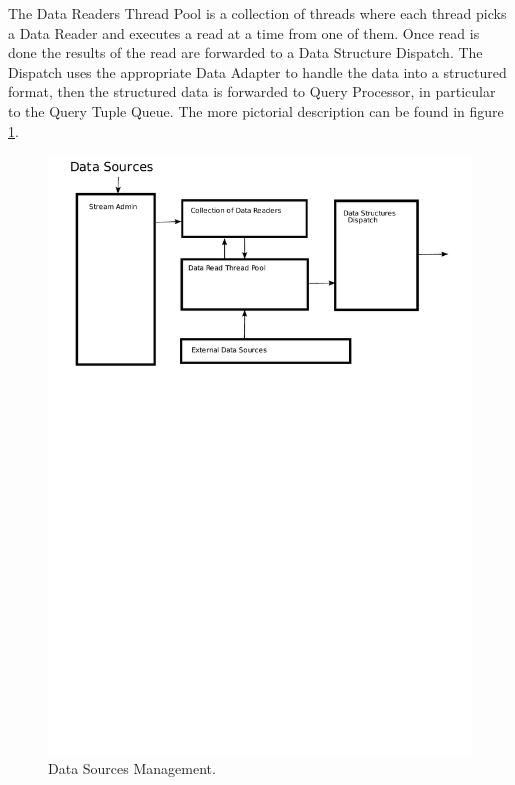 \documentclass[11pt]{article}
\begin{document}
The Data Readers Thread Pool is a collection of threads where each thread picks a Data Reader and executes a read at a time from one of them. Once read is done the results of the read are forwarded to a Data Structure Dispatch. The Dispatch uses the appropriate Data Adapter to handle the data into a structured format, then the structured data is forwarded to Query Processor, in particular to the Query Tuple Queue. The more pictorial description can be found in figure \ref{DataSourcePic}.


\begin{figure}
  \includegraphics[width=5.00in]{../figures/DataSources.pdf}
  \caption{Data Sources Management.}
  \label{DataSourcePic}
\end{figure}
\end{document}
